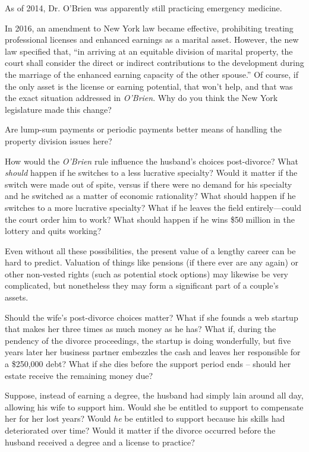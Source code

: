 
\item As of 2014, Dr. O'Brien was apparently still practicing emergency
medicine.

In 2016, an amendment to New York law became effective, prohibiting treating
professional licenses and enhanced earnings as a marital asset. However, the
new law specified that, ``in arriving at an equitable division of marital
property, the court shall consider the direct or indirect contributions to the
development during the marriage of the enhanced earning capacity of the other
spouse.'' Of course, if the only asset is the license or earning potential,
that won't help, and that was the exact situation addressed in
\textit{O'Brien}. Why do you think the New York legislature made this change?

\item
Are lump-sum payments or periodic payments better means of handling the property
division issues here?

\item
How would the \textit{O'Brien} rule influence the husband's choices
post-divorce? What \textit{should} happen if he switches to a less lucrative
specialty? Would it matter if the switch were made out of spite, versus if
there were no demand for his specialty and he switched as a matter of economic
rationality? What should happen if he switches to a more lucrative specialty?
What if he leaves the field entirely---could the court order him to work?
What should happen if he wins \$50 million in the lottery and quits working?

Even without all these possibilities, the present value of a lengthy career can
be hard to predict. Valuation of things like pensions (if there ever are any
again) or other non-vested rights (such as potential stock options) may
likewise be very complicated, but nonetheless they may form a significant part
of a couple's assets.

\item
Should the wife's post-divorce choices matter? What if she founds a web startup
that makes her three times as much money as he has? What if, during the
pendency of the divorce proceedings, the startup is doing wonderfully, but five
years later her business partner embezzles the cash and leaves her responsible
for a \$250,000 debt? What if she dies before the support period ends --
should her estate receive the remaining money due?

Suppose, instead of earning a degree, the husband had simply lain around all
day, allowing his wife to support him. Would she be entitled to support to
compensate her for her lost years? Would \textit{he} be entitled to support
because his skills had deteriorated over time? Would it matter if the divorce
occurred before the husband received a degree and a license to practice?

